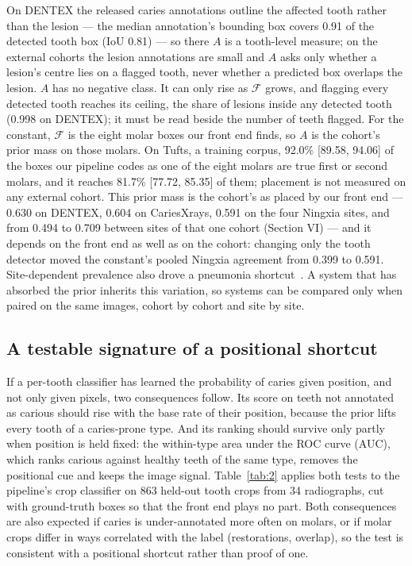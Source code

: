 \documentclass[conference]{IEEEtran}
\begin{document}
On DENTEX the released caries annotations outline the affected tooth rather than the lesion — the median annotation's bounding box covers 0.91 of the detected tooth box (IoU 0.81) — so there $A$ is a tooth-level measure; on the external cohorts the lesion annotations are small and $A$ asks only whether a lesion's centre lies on a flagged tooth, never whether a predicted box overlaps the lesion. $A$ has no negative class. It can only rise as $\mathcal{F}$ grows, and flagging every detected tooth reaches its ceiling, the share of lesions inside any detected tooth (0.998 on DENTEX); it must be read beside the number of teeth flagged. For the constant, $\mathcal{F}$ is the eight molar boxes our front end finds, so $A$ is the cohort's prior mass on those molars. On Tufts, a training corpus, 92.0\% [89.58, 94.06] of the boxes our pipeline codes as one of the eight molars are true first or second molars, and it reaches 81.7\% [77.72, 85.35] of them; placement is not measured on any external cohort. This prior mass is the cohort's as placed by our front end — 0.630 on DENTEX, 0.604 on CariesXrays, 0.591 on the four Ningxia sites, and from 0.494 to 0.709 between sites of that one cohort (Section VI) — and it depends on the front end as well as on the cohort: changing only the tooth detector moved the constant's pooled Ningxia agreement from 0.399 to 0.591. Site-dependent prevalence also drove a pneumonia shortcut~\cite{zech2018variable}. A system that has absorbed the prior inherits this variation, so systems can be compared only when paired on the same images, cohort by cohort and site by site.

\subsection{A testable signature of a positional shortcut}

If a per-tooth classifier has learned the probability of caries given position, and not only given pixels, two consequences follow. Its score on teeth not annotated as carious should rise with the base rate of their position, because the prior lifts every tooth of a caries-prone type. And its ranking should survive only partly when position is held fixed: the within-type area under the ROC curve (AUC), which ranks carious against healthy teeth of the same type, removes the positional cue and keeps the image signal. Table~\ref{tab:2} applies both tests to the pipeline's crop classifier on 863 held-out tooth crops from 34 radiographs, cut with ground-truth boxes so that the front end plays no part. Both consequences are also expected if caries is under-annotated more often on molars, or if molar crops differ in ways correlated with the label (restorations, overlap), so the test is consistent with a positional shortcut rather than proof of one.
\end{document}
